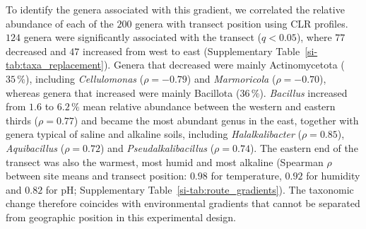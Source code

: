 \documentclass[fleqn,10pt,numbers]{olplainarticle}
\let\LaTeXbegin\begin \let\LaTeXend\end
\let\begin\LaTeXbegin \let\end\LaTeXend
\begin{document}
\begin{table}[htbp]
\centering\footnotesize
\caption{Distance decay, partitioning of Sørensen dissimilarity and core genera
by compartment. Aitchison slope: increase in Aitchison dissimilarity per
$100$~km. Sørensen, turnover and nestedness: mean pairwise dissimilarity
between sites after rarefaction, with the increase per
$100$~km in parentheses. Core genera: genera present at $\geq90\,\%$ of sites after $20$ rarefaction draws (detection in at least half of draws). Genera per site is the median across $60$ sites. All common-depth calculations use $12{,}865$ reads. Aitchison intervals use the delete-one-site jackknife.}
\label{tab:decay}
\end{table}

To identify the genera associated with this gradient, we correlated the relative abundance of each of the $200$ genera with transect position using CLR profiles. $124$ genera were significantly associated with the transect ($q<0.05$), where $77$ decreased and $47$ increased from west to east (Supplementary Table~\ref{si-tab:taxa_replacement}). Genera that decreased were mainly Actinomycetota ($35\,\%$), including \textit{Cellulomonas} ($\rho=-0.79$) and \textit{Marmoricola} ($\rho=-0.70$), whereas genera that increased were mainly Bacillota ($36\,\%$). \textit{Bacillus} increased from $1.6$ to $6.2\,\%$ mean relative abundance between the western and eastern thirds ($\rho=0.77$) and became the most abundant genus in the east, together with genera typical of saline and alkaline soils, including \textit{Halalkalibacter} ($\rho=0.85$), \textit{Aquibacillus} ($\rho=0.72$) and \textit{Pseudalkalibacillus} ($\rho=0.74$). The eastern end of the transect was also the warmest, most humid and most alkaline (Spearman $\rho$ between site means and transect position: $0.98$ for temperature, $0.92$ for humidity and $0.82$ for pH; Supplementary Table~\ref{si-tab:route_gradients}). The taxonomic change therefore coincides with environmental gradients that cannot be separated from geographic position in this experimental design.
\end{document}
